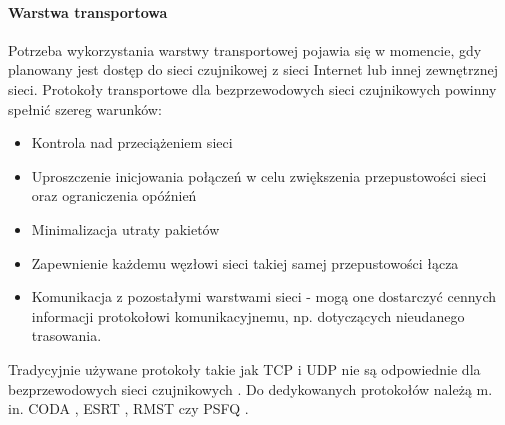 \paragraph{Warstwa transportowa}
Potrzeba wykorzystania warstwy transportowej pojawia się w momencie, gdy planowany jest dostęp do sieci czujnikowej z sieci Internet lub innej zewnętrznej sieci. Protokoły transportowe dla bezprzewodowych sieci czujnikowych powinny spełnić szereg warunków:
\begin{itemize}
\item Kontrola nad przeciążeniem sieci
\item Uproszczenie inicjowania połączeń w celu zwiększenia przepustowości sieci oraz ograniczenia opóźnień
\item Minimalizacja utraty pakietów
\item Zapewnienie każdemu węzłowi sieci takiej samej przepustowości łącza
\item Komunikacja z pozostałymi warstwami sieci - mogą one dostarczyć cennych informacji protokołowi komunikacyjnemu, np. dotyczących nieudanego trasowania.
\end{itemize}
Tradycyjnie używane protokoły takie jak TCP i UDP nie są odpowiednie dla bezprzewodowych sieci czujnikowych \cite{Fahmy2016-2}. Do dedykowanych protokołów należą m. in. CODA \cite{Wan2003}, ESRT \cite{Akan2005}, RMST \cite{Stann2003} czy PSFQ \cite{Wan2002}.

